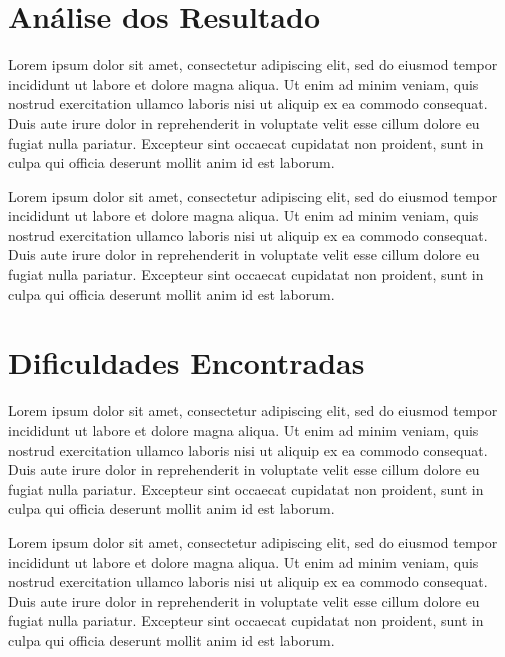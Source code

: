 \documentclass{acm_proc_article-sp}
\begin{document}
\section{Análise dos Resultado}

	Lorem ipsum dolor sit amet, consectetur adipiscing elit, sed do 
	eiusmod tempor incididunt ut labore et dolore magna aliqua. Ut 
	enim ad minim veniam, quis nostrud exercitation ullamco laboris 
	nisi ut aliquip ex ea commodo consequat. Duis aute irure dolor in 
	reprehenderit in voluptate velit esse cillum dolore eu fugiat 
	nulla pariatur. Excepteur sint occaecat cupidatat non proident, 
	sunt in culpa qui officia deserunt mollit anim id est laborum.

	Lorem ipsum dolor sit amet, consectetur adipiscing elit, sed do 
	eiusmod tempor incididunt ut labore et dolore magna aliqua. Ut 
	enim ad minim veniam, quis nostrud exercitation ullamco laboris 
	nisi ut aliquip ex ea commodo consequat. Duis aute irure dolor in 
	reprehenderit in voluptate velit esse cillum dolore eu fugiat 
	nulla pariatur. Excepteur sint occaecat cupidatat non proident, 
	sunt in culpa qui officia deserunt mollit anim id est laborum.

\section{Dificuldades Encontradas}

	Lorem ipsum dolor sit amet, consectetur adipiscing elit, sed do 
	eiusmod tempor incididunt ut labore et dolore magna aliqua. Ut 
	enim ad minim veniam, quis nostrud exercitation ullamco laboris 
	nisi ut aliquip ex ea commodo consequat. Duis aute irure dolor in 
	reprehenderit in voluptate velit esse cillum dolore eu fugiat 
	nulla pariatur. Excepteur sint occaecat cupidatat non proident, 
	sunt in culpa qui officia deserunt mollit anim id est laborum.

	Lorem ipsum dolor sit amet, consectetur adipiscing elit, sed do 
	eiusmod tempor incididunt ut labore et dolore magna aliqua. Ut 
	enim ad minim veniam, quis nostrud exercitation ullamco laboris 
	nisi ut aliquip ex ea commodo consequat. Duis aute irure dolor in 
	reprehenderit in voluptate velit esse cillum dolore eu fugiat 
	nulla pariatur. Excepteur sint occaecat cupidatat non proident, 
	sunt in culpa qui officia deserunt mollit anim id est laborum.


%

%

\end{document}
